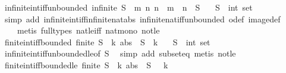 \begin{isabellebody}
\endisatagproof
{\isafoldproof}%
%
\isadelimproof
\isanewline
%
\endisadelimproof
\isanewline
{}\isamarkupfalse%
\ infinite{\isacharunderscore}int{\isacharunderscore}iff{\isacharunderscore}unbounded{\isacharcolon}\ {\isachardoublequoteopen}infinite\ S\ {\isasymlongleftrightarrow}\ {\isacharparenleft}{\isasymforall}m{\isachardot}\ {\isasymexists}n{\isachardot}\ {\isasymbar}n{\isasymbar}\ {\isachargreater}\ m\ {\isasymand}\ n\ {\isasymin}\ S{\isacharparenright}{\isachardoublequoteclose}\isanewline
\ \ \ S\ {\isacharcolon}{\isacharcolon}\ {\isachardoublequoteopen}int\ set{\isachardoublequoteclose}\isanewline
%
\isadelimproof
\ \ %
\endisadelimproof
%
\isatagproof
{}\isamarkupfalse%
\ {\isacharparenleft}simp\ add{\isacharcolon}\ infinite{\isacharunderscore}int{\isacharunderscore}iff{\isacharunderscore}infinite{\isacharunderscore}nat{\isacharunderscore}abs\ infinite{\isacharunderscore}nat{\isacharunderscore}iff{\isacharunderscore}unbounded\ o{\isacharunderscore}def\ image{\isacharunderscore}def{\isacharparenright}\isanewline
\ \ \ \ {\isacharparenleft}metis\ {\isacharparenleft}full{\isacharunderscore}types{\isacharparenright}\ nat{\isacharunderscore}le{\isacharunderscore}iff\ nat{\isacharunderscore}mono\ not{\isacharunderscore}le{\isacharparenright}%
\endisatagproof
{\isafoldproof}%
%
\isadelimproof
\isanewline
%
\endisadelimproof
\isanewline
{}\isamarkupfalse%
\ finite{\isacharunderscore}int{\isacharunderscore}iff{\isacharunderscore}bounded{\isacharcolon}\ {\isachardoublequoteopen}finite\ S\ {\isasymlongleftrightarrow}\ {\isacharparenleft}{\isasymexists}k{\isachardot}\ abs\ {\isacharbackquote}\ S\ {\isasymsubseteq}\ {\isacharbraceleft}{\isachardot}{\isachardot}{\isacharless}k{\isacharbraceright}{\isacharparenright}{\isachardoublequoteclose}\isanewline
\ \ \ S\ {\isacharcolon}{\isacharcolon}\ {\isachardoublequoteopen}int\ set{\isachardoublequoteclose}\isanewline
%
\isadelimproof
\ \ %
\endisadelimproof
%
\isatagproof
{}\isamarkupfalse%
\ infinite{\isacharunderscore}int{\isacharunderscore}iff{\isacharunderscore}unbounded{\isacharunderscore}le{\isacharbrackleft}of\ S{\isacharbrackright}\ \isamarkupfalse%
\ {\isacharparenleft}simp\ add{\isacharcolon}\ subset{\isacharunderscore}eq{\isacharparenright}\ {\isacharparenleft}metis\ not{\isacharunderscore}le{\isacharparenright}%
\endisatagproof
{\isafoldproof}%
%
\isadelimproof
\isanewline
%
\endisadelimproof
\isanewline
{}\isamarkupfalse%
\ finite{\isacharunderscore}int{\isacharunderscore}iff{\isacharunderscore}bounded{\isacharunderscore}le{\isacharcolon}\ {\isachardoublequoteopen}finite\ S\ {\isasymlongleftrightarrow}\ {\isacharparenleft}{\isasymexists}k{\isachardot}\ abs\ {\isacharbackquote}\ S\ {\isasymsubseteq}\ {\isacharbraceleft}{\isachardot}{\isachardot}\ k{\isacharbraceright}{\isacharparenright}{\isachardoublequoteclose}\isanewline

\end{isabellebody}
